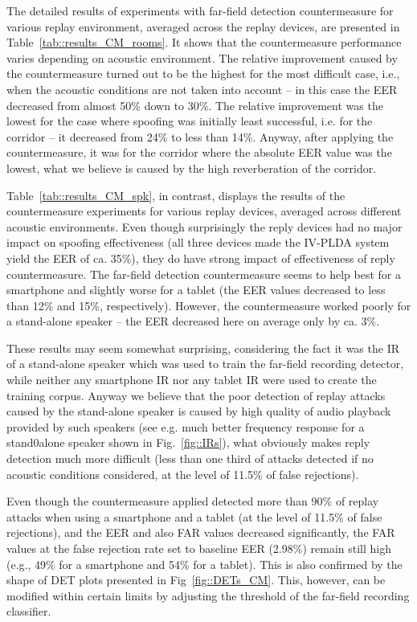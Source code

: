The detailed results of experiments with far-field detection countermeasure for various replay environment, averaged across the replay devices, are presented in Table~\ref{tab::results_CM_rooms}. It shows that the countermeasure performance varies depending on acoustic environment. The relative improvement caused by the countermeasure turned out to be the highest for the most difficult case, i.e., when the acoustic conditions are not taken into account -- in this case the EER decreased from almost 50\% down to 30\%. The relative improvement was the lowest for the case where spoofing was initially least successful, i.e. for the corridor -- it decreased from 24\% to less than 14\%. Anyway, after applying the countermeasure, it was for the corridor where the absolute EER value was the lowest, what we believe is caused by the high reverberation of the corridor.

Table~\ref{tab::results_CM_spk}, in contrast, displays the results of the countermeasure experiments for various replay devices, averaged across different acoustic environments. Even though surprisingly the reply devices had no major impact on spoofing effectiveness (all three devices made the IV-PLDA system yield the EER of ca. 35\%), they do have strong impact of effectiveness of reply countermeasure. The far-field detection countermeasure seems to help best for a smartphone and slightly worse for a tablet (the EER values decreased to less than 12\% and 15\%, respectively). However, the countermeasure worked poorly for a stand-alone speaker -- the EER decreased here on average only by ca. 3\%. 

These results may seem somewhat surprising, considering the fact it was the IR of a stand-alone speaker which was used to train the far-field recording detector, while neither any smartphone IR nor any tablet IR were used to create the training corpus. Anyway we believe that the poor detection of replay attacks caused by the stand-alone speaker is caused by high quality of audio playback provided by such speakers (see e.g. much better frequency response for a stand0alone speaker shown in Fig.~\ref{fig::IRs}), what obviously makes reply detection much more difficult (less than one third of attacks detected if no acoustic conditions considered, at the level of 11.5\% of false rejections). 

Even though the countermeasure applied detected more than 90\% of replay attacks when using a smartphone and a tablet (at the level of 11.5\% of false rejections), and the EER and also FAR values decreased significantly, the FAR values at the false rejection rate set to baseline EER (2.98\%) remain still high (e.g., 49\% for a smartphone and 54\% for a tablet). This is also confirmed by the shape of DET plots presented in Fig~\ref{fig::DETs_CM}. This, however, can be modified within certain limits by adjusting the threshold of the far-field recording classifier.

